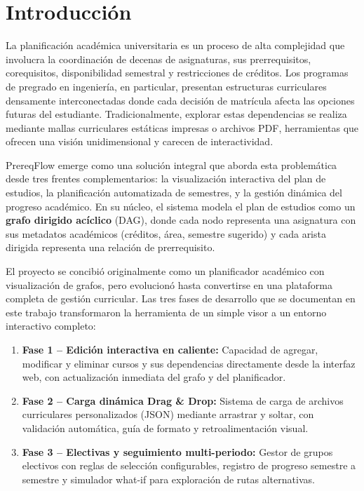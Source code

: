 \documentclass[12pt]{report}
\begin{document}

\tableofcontents

\newpage

\chapter{Introducción}

La planificación académica universitaria es un proceso de alta complejidad que involucra la coordinación de decenas de asignaturas, sus prerrequisitos, corequisitos, disponibilidad semestral y restricciones de créditos. Los programas de pregrado en ingeniería, en particular, presentan estructuras curriculares densamente interconectadas donde cada decisión de matrícula afecta las opciones futuras del estudiante. Tradicionalmente, explorar estas dependencias se realiza mediante mallas curriculares estáticas impresas o archivos PDF, herramientas que ofrecen una visión unidimensional y carecen de interactividad.

PrereqFlow emerge como una solución integral que aborda esta problemática desde tres frentes complementarios: la visualización interactiva del plan de estudios, la planificación automatizada de semestres, y la gestión dinámica del progreso académico. En su núcleo, el sistema modela el plan de estudios como un \textbf{grafo dirigido acíclico} (DAG), donde cada nodo representa una asignatura con sus metadatos académicos (créditos, área, semestre sugerido) y cada arista dirigida representa una relación de prerrequisito.

El proyecto se concibió originalmente como un planificador académico con visualización de grafos, pero evolucionó hasta convertirse en una plataforma completa de gestión curricular. Las tres fases de desarrollo que se documentan en este trabajo transformaron la herramienta de un simple visor a un entorno interactivo completo:

\begin{enumerate}
    \item \textbf{Fase 1 -- Edición interactiva en caliente:} Capacidad de agregar, modificar y eliminar cursos y sus dependencias directamente desde la interfaz web, con actualización inmediata del grafo y del planificador.
        \item \textbf{Fase 2 -- Carga dinámica Drag \& Drop:} Sistema de carga de archivos curriculares personalizados (JSON) mediante arrastrar y soltar, con validación automática, guía de formato y retroalimentación visual.
    \item \textbf{Fase 3 -- Electivas y seguimiento multi-periodo:} Gestor de grupos electivos con reglas de selección configurables, registro de progreso semestre a semestre y simulador what-if para exploración de rutas alternativas.
\end{enumerate}
\end{document}

